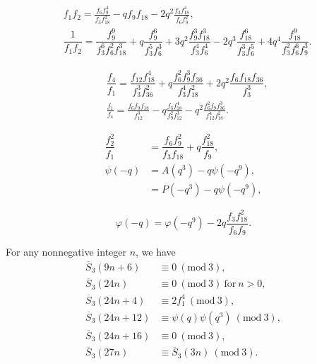 \documentclass[10pt,a4paper]{amsart}
\begin{document}
 \begin{align}
    &f_{1}f_{2}= \frac{f_{6} f_{9}^{4}}{ f_{3} f_{18}^{2}}-qf_{9}f_{18} -2q^{2} \frac{f_{3} f_{18}^{4}}{f_{6} f_{9}^{2}}, \label{lemma2.1}\\
    &\dfrac{1}{f_{1}f_{2}}=\dfrac{f_{9}^{9}}{f_{3}^{6}f_{6}^{2}f_{18}^{3}}+q\dfrac{f_{9}^{6}}{f_{3}^{5}f_{6}^{3}}+3q^{2}\dfrac{f_{9}^{3}f_{18}^{3}}{f_{3}^{4}f_{6}^{4}}-2q^{3}\dfrac{f_{18}^{6}}{f_{3}^{3}f_{6}^{5}}+4q^{4}\dfrac{f_{18}^{9}}{f_{3}^{2}f_{6}^{6}f_{9}^{3}}. \label{lemma2.2}
    \end{align}

\begin{align}
&\dfrac{f_{4}}{f_{1}}=\dfrac{f_{12}f_{18}^{4}}{f_{3}^{3}f_{36}^{2}}+ q\dfrac{f_{6}^{2}f_{9}^{3}f_{36}}{f_{3}^{4}f_{18}^{2}}+2q^{2}\dfrac{f_{6}f_{18}f_{36}}{f_{3}^{3}}, \label{lemma4.1}\\
&\frac{f_{1}}{f_{4}}= \frac{f_{6} f_{9} f_{18}}{f_{12}^{3}}-q\frac{f_{3} f_{18}^{4}}{f_{9}^{2} f_{12}^{3}}-q^{2} \frac{f_{6}^{2} f_{9} f_{36}^{3}}{f_{12}^{4} f_{18}^{2}}. \label{lemma4.2}
\end{align}

\begin{align}
\dfrac{f_{2}^{2}}{f_{1}}&=\dfrac{f_{6}f_{9}^{2}}{f_{3}f_{18}}+q\dfrac{f_{18}^{2}}{f_{9}}, \label{lemma8.1}\\
\psi(-q)&= A(q^{3}) - q \psi(-q^{9}), \label{lemma8.2}\\
&= P(-q^{3}) - q \psi(-q^{9}), \label{lemma8.3}
\end{align}

\begin{equation}
\varphi(-q)=\varphi(-q^9) -2q\dfrac{f_{3}f_{18}^{2}}{f_{6}f_{9}}. \label{lemma10.1}
\end{equation}

\begin{theorem} \label{thm1} For any nonnegative integer $n$, we have
\begin{align}
\overline{S}_{3}(9n+6) &\equiv0 \ (\mathrm{mod} \ 3), \label{thm1-cong11}\\
\overline{S}_{3}(24n) &\equiv  0 \ (\mathrm{mod} \ 3) \ \text{for} \ n>0, \label{thm1-cong1}\\
\overline{S}_{3}(24n+4) &\equiv  2 f_{1}^{4} \ (\mathrm{mod} \ 3), \label{thm1-cong2}\\
\overline{S}_{3}(24n+12) &\equiv  \psi(q) \psi(q^{3}) \ (\mathrm{mod} \ 3), \label{thm1-cong3}\\
\overline{S}_{3}(24n+16) &\equiv  0 \ (\mathrm{mod} \ 3), \label{thm1-cong4}\\
\overline{S}_{3}(27n) &\equiv  \overline{S}_{3}(3n) \ (\mathrm{mod} \ 3). \label{thm1-cong5}
\end{align}
\end{theorem}
\end{document}
